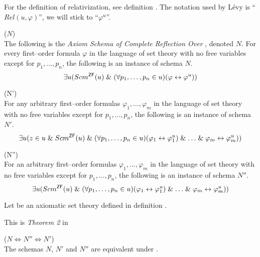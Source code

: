 For the definition of relativization, see definition . The notation used by Lévy is ``$Rel(u, \varphi)$'', we will stick to ``$\varphi^{u}$''.
\begin{definition}{($N$)}\label{def:levy_axiom_n}\\
The following is the \emph{Axiom Schema of Complete Reflection Over }, denoted $N$. For every first–order formula $\varphi$ in the language of set theory with no free variables except for $p_1, \ldots , p_n$, the following is an instance of schema $N$.
\begin{equation}
\exists u (Scm^{\sf{ZF}}(u) \mathrel{\&} (\forall p_1, \ldots, p_n \in u)(\varphi \leftrightarrow \varphi^{u}))
\end{equation}
\end{definition}

\begin{definition}{(N')}\label{def:levy_axiom_n'}\\
For any arbitrary first–order formulas $\varphi_1, \ldots, \varphi_m$ in the language of set theory with no free variables except for $p_1, \ldots , p_n$, the following is an instance of schema $N'$.
\begin{equation}
\exists u (z \in u \mathrel{\&} Scm^{\sf{ZF}}(u) \mathrel{\&} (\forall p_1, \ldots, p_n \in u)(\varphi_1 \leftrightarrow \varphi_1^{u}) \mathrel{\&} \ldots \mathrel{\&} \varphi_m \leftrightarrow \varphi_m^{u}))
\end{equation}
\end{definition}

\begin{definition}{(N'')}\label{def:levy_axiom_n''}\\
For an arbitrary first–order formulas $\varphi_1, \ldots, \varphi_m$ in the language of set theory with no free variables except for $p_1, \ldots , p_n$, the following is an instance of schema $N''$.
\begin{equation}
\exists u (Scm^{\sf{ZF}}(u) \mathrel{\&} (\forall p_1, \ldots, p_n \in u)(\varphi_1 \leftrightarrow \varphi_1^{u}) \mathrel{\&} \ldots \mathrel{\&} \varphi_m \leftrightarrow \varphi_m^{u}))
\end{equation}
\end{definition}

Let  be an axiomatic set theory defined in definition .

This is \emph{Theorem 2} in \cite{Levy60a}
\begin{lemma}{($N \iff N'' \iff N'$)}\label{lemma:n_iff_n'}\\
The schemas $N$, $N'$ and $N''$ are equivalent under .
\end{lemma}

